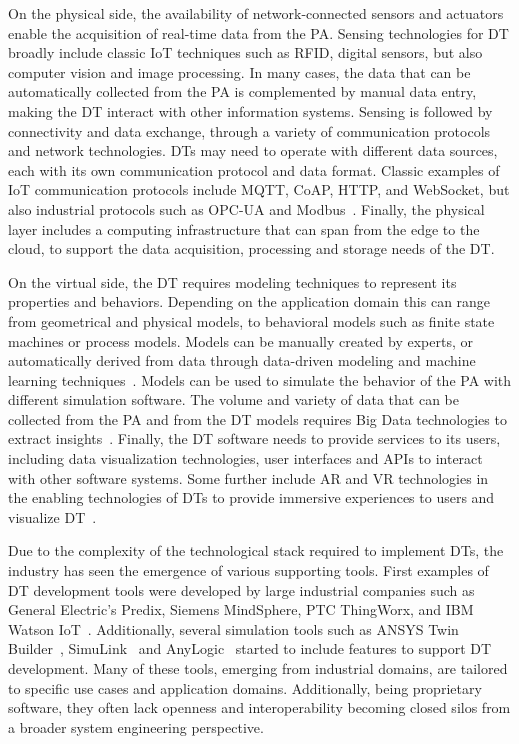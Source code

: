 On the physical side, the availability of network-connected sensors and actuators enable the acquisition of real-time data from the \ac{PA}.
%
Sensing technologies for \ac{DT} broadly include classic \ac{IoT} techniques such as RFID, digital sensors,
but also computer vision and image processing.
%
In many cases, the data that can be automatically collected from the \ac{PA} is complemented by manual data entry, making the \ac{DT} interact with other information systems.
%
Sensing is followed by connectivity and data exchange, through a variety of communication protocols and network technologies.
%
\acp{DT} may need to operate with different data sources, each with its own communication protocol and data format.
%
Classic examples of \ac{IoT} communication protocols include MQTT, CoAP, HTTP, and WebSocket, but also industrial protocols such as OPC-UA and Modbus~\cite{Fortino_Savaglio_2023}. 
%
Finally, the physical layer includes a computing infrastructure that can span from the edge to the cloud, to support the data acquisition, processing and storage needs of the \ac{DT}.

On the virtual side, the \ac{DT} requires modeling techniques to represent its properties and behaviors.
%
Depending on the application domain this can range from geometrical and physical models, to behavioral models such as finite state machines or process models.
%
Models can be manually created by experts, or automatically derived from data through data-driven modeling and machine learning techniques~\cite{Tao_Xiao_Qi_Cheng_Ji_2022}.
%
Models can be used to simulate the behavior of the \ac{PA} with different simulation software.
%
The volume and variety of data that can be collected from the \ac{PA} and from the \ac{DT} models requires Big Data technologies to extract insights~\cite{Tao_Cheng_Qi_Zhang_Zhang_Sui_2018}. 
%
Finally, the \ac{DT} software needs to provide services to its users, including data visualization technologies, user interfaces and \acp{API} to interact with other software systems.
%
Some further include \ac{AR} and \ac{VR} technologies in the enabling technologies of \acp{DT} to provide immersive experiences to users and visualize \ac{DT}~\cite{Mihai_survey_enabling_2022}.


Due to the complexity of the technological stack required to implement \acp{DT}, the industry has seen the emergence of various supporting tools.
%
First examples of \ac{DT} development tools were developed by large industrial companies such as General Electric's Predix, Siemens MindSphere, PTC ThingWorx, and IBM Watson \ac{IoT}~\cite{Fuller_Fan_Day_Barlow_2020,Adamenko_Kunnen_Nagarajah_2020}.
%
Additionally, several simulation tools such as  ANSYS Twin Builder~\cite{ansys_twinbuilder}, SimuLink~\cite{mathworks_digitaltwin} and AnyLogic~\cite{anylogic_digitaltwin} started to include features to support \ac{DT} development. 
%
Many of these tools, emerging from industrial domains, are tailored to specific use cases and application domains.
%
Additionally, being proprietary software, they often lack openness and interoperability becoming closed silos from a broader system engineering perspective. 

